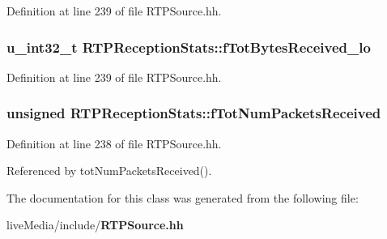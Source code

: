 Definition at line 239 of file R\+T\+P\+Source.\+hh.

\subsubsection[{f\+Tot\+Bytes\+Received\+\_\+lo}]{\setlength{\rightskip}{0pt plus 5cm}u\+\_\+int32\+\_\+t R\+T\+P\+Reception\+Stats\+::f\+Tot\+Bytes\+Received\+\_\+lo\hspace{0.3cm}{\ttfamily [protected]}}\label{classRTPReceptionStats_ae019ce2459f91451a7e68ac65cdc3ed0}


Definition at line 239 of file R\+T\+P\+Source.\+hh.

\subsubsection[{f\+Tot\+Num\+Packets\+Received}]{\setlength{\rightskip}{0pt plus 5cm}unsigned R\+T\+P\+Reception\+Stats\+::f\+Tot\+Num\+Packets\+Received\hspace{0.3cm}{\ttfamily [protected]}}\label{classRTPReceptionStats_a00dfdb13415db3689712ff7f65d3d2f2}


Definition at line 238 of file R\+T\+P\+Source.\+hh.



Referenced by tot\+Num\+Packets\+Received().



The documentation for this class was generated from the following file\+:\begin{DoxyCompactItemize}
\item 
live\+Media/include/{\bf R\+T\+P\+Source.\+hh}\end{DoxyCompactItemize}
